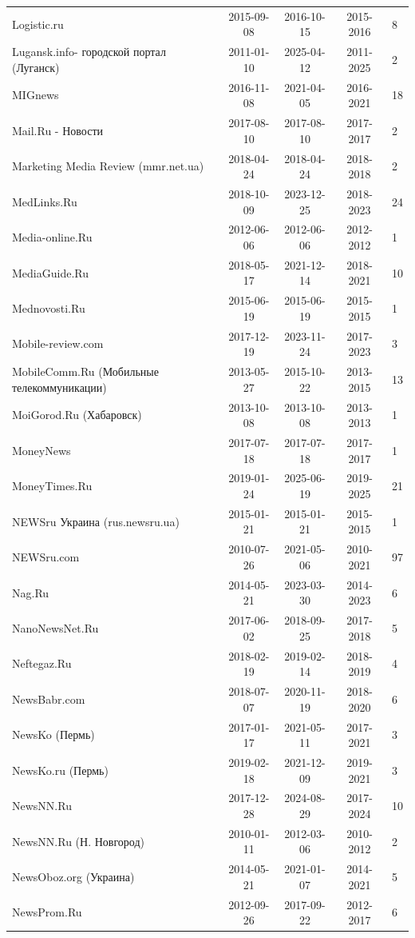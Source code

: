 \begin{longtable}{p{6cm}cccp{2cm}}
Logistic.ru & 2015-09-08 & 2016-10-15 & 2015-2016 & 8\\
Lugansk.info- городской портал (Луганск) & 2011-01-10 & 2025-04-12 & 2011-2025 & 2\\
MIGnews & 2016-11-08 & 2021-04-05 & 2016-2021 & 18\\
Mail.Ru - Новости & 2017-08-10 & 2017-08-10 & 2017-2017 & 2\\
Marketing Media Review (mmr.net.ua) & 2018-04-24 & 2018-04-24 & 2018-2018 & 2\\
MedLinks.Ru & 2018-10-09 & 2023-12-25 & 2018-2023 & 24\\
Media-online.Ru & 2012-06-06 & 2012-06-06 & 2012-2012 & 1\\
MediaGuide.Ru & 2018-05-17 & 2021-12-14 & 2018-2021 & 10\\
Mednovosti.Ru & 2015-06-19 & 2015-06-19 & 2015-2015 & 1\\
Mobile-review.com & 2017-12-19 & 2023-11-24 & 2017-2023 & 3\\
MobileComm.Ru (Мобильные телекоммуникации) & 2013-05-27 & 2015-10-22 & 2013-2015 & 13\\
MoiGorod.Ru (Хабаровск) & 2013-10-08 & 2013-10-08 & 2013-2013 & 1\\
MoneyNews & 2017-07-18 & 2017-07-18 & 2017-2017 & 1\\
MoneyTimes.Ru & 2019-01-24 & 2025-06-19 & 2019-2025 & 21\\
NEWSru Украина (rus.newsru.ua) & 2015-01-21 & 2015-01-21 & 2015-2015 & 1\\
NEWSru.com & 2010-07-26 & 2021-05-06 & 2010-2021 & 97\\
Nag.Ru & 2014-05-21 & 2023-03-30 & 2014-2023 & 6\\
NanoNewsNet.Ru & 2017-06-02 & 2018-09-25 & 2017-2018 & 5\\
Neftegaz.Ru & 2018-02-19 & 2019-02-14 & 2018-2019 & 4\\
NewsBabr.com & 2018-07-07 & 2020-11-19 & 2018-2020 & 6\\
NewsKo (Пермь) & 2017-01-17 & 2021-05-11 & 2017-2021 & 3\\
NewsKo.ru (Пермь) & 2019-02-18 & 2021-12-09 & 2019-2021 & 3\\
NewsNN.Ru & 2017-12-28 & 2024-08-29 & 2017-2024 & 10\\
NewsNN.Ru (Н. Новгород) & 2010-01-11 & 2012-03-06 & 2010-2012 & 2\\
NewsOboz.org (Украина) & 2014-05-21 & 2021-01-07 & 2014-2021 & 5\\
NewsProm.Ru & 2012-09-26 & 2017-09-22 & 2012-2017 & 6\\

\end{longtable}
